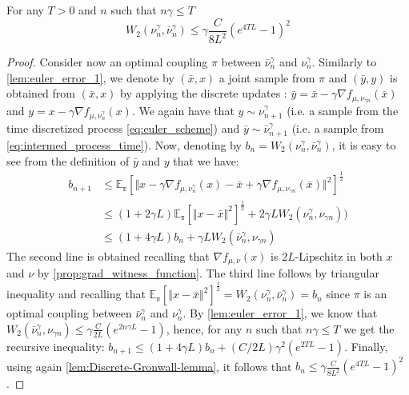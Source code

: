 \begin{lemma}\label{lem:euler_error_2}
For any $T>0$ and $n$ such that $n\gamma\leq T$
\begin{equation}
W_{2}(\nu_{n}^{\gamma},\bar{\nu}_{n}^{\gamma})\leq\gamma\frac{C}{8L^2}(e^{4TL}-1)^{2}
\end{equation}
\end{lemma}
\begin{proof}
Consider now an optimal coupling $\pi$ between $\bar{\nu}_{n}^{\gamma}$
and $\nu_{n}^{\gamma}$. Similarly to \cref{lem:euler_error_1}, we
denote by $(\bar{x},x)$ a joint sample from $\pi$ and $(\bar{y},y)$
is obtained from $(\bar{x},x)$  by applying the discrete updates  : $\bar{y}=\bar{x}-\gamma\nabla f_{\mu,\nu_{\gamma n}}(\bar{x})$ and $y=x-\gamma\nabla f_{\mu,\nu_{n}^{\gamma}}(x)$. We again have that $y\sim\nu_{n+1}^{\gamma}$ (i.e. a sample from the time discretized process \eqref{eq:euler_scheme}) and $\bar{y}\sim\bar{\nu}_{n+1}^{\gamma}$ (i.e. a sample from \eqref{eq:intermed_process_time}).
Now, denoting by $b_{n}=W_{2}(\nu_{n}^{\gamma},\bar{\nu}_{n}^{\gamma})$, it is easy to see from the definition of $\bar{y}$ and $y$ that
we have:
\begin{align*}
b_{n+1} & \leq\mathbb{E_{\pi}}\left[\Vert x-\gamma\nabla f_{\mu,\nu_{n}^{\gamma}}(x)-\bar{x}+\gamma\nabla f_{\mu,\nu_{\gamma n}}(\bar{x})\Vert^{2}\right]^{\frac{1}{2}}\\
&\leq (1+2\gamma L)  \mathbb{E_{\pi}}\left[\Vert x-\bar{x}\Vert^2\right]^{\frac{1}{2}} + 2\gamma L W_2(\nu_n^{\gamma},\nu_{\gamma n}))\\
 & \leq (1+ 4\gamma L)b_n + \gamma L W_2(\bar{\nu}_n^{\gamma},\nu_{\gamma n})
\end{align*}
The second line is obtained recalling that $\nabla f_{\mu,\nu}(x)$ is $2L$-Lipschitz in both $x$
and $\nu$ by \cref{prop:grad_witness_function}. The third line follows by triangular inequality and recalling that $\mathbb{E_{\pi}}\left[\Vert x-\bar{x}\Vert^2\right]^{\frac{1}{2}}= W_2(\nu_n^{\gamma},\bar{\nu}_n^{\gamma}) = b_n$ since $\pi$ is an optimal coupling between $\bar{\nu}_{n}^{\gamma}$
and $\nu_{n}^{\gamma}$. 
By \cref{lem:euler_error_1}, we know that $W_2(\bar{\nu}_n^{\gamma},\nu_{\gamma n})\leq\gamma\frac{C}{2L}(e^{2n\gamma L}-1)$, hence, for any $n$ such that $n\gamma\leq T$ we get the recursive inequality: $b_{n+1}\leq(1+4\gamma L)b_{n}+(C/2L)\gamma^{2}(e^{2TL}-1)$. Finally, using again \cref{lem:Discrete-Gronwall-lemma}, it follows that $b_{n}\leq\gamma\frac{C}{8L^2}(e^{4TL}-1)^{2}$.
\end{proof}
%

